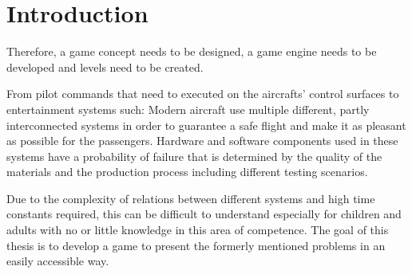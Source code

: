 \section{Introduction}\label{sec:introduction}


Therefore, a game concept needs to be designed, a game engine needs to be developed and levels need to be created.

From pilot commands that need to executed on the aircrafts' control surfaces to entertainment systems such:
Modern aircraft use multiple different, partly interconnected systems in order to guarantee a safe flight and make it
as pleasant as possible for the passengers.
Hardware and software components used in these systems have a probability of failure that is determined by the quality of the materials
and the production process including different testing scenarios. 

Due to the complexity of relations between different systems and high time constants required, this can be difficult
to understand especially for children and adults with no or little knowledge in this area of competence.
The goal of this thesis is to develop a game to present the formerly mentioned problems in an easily
accessible way.
